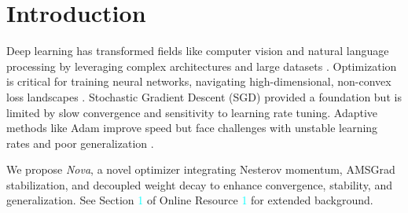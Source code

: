 \documentclass[10pt,twocolumn]{article}
\begin{document}
\begin{abstract}


\noindent\textbf{Keywords:} Deep learning, Optimization, Adaptive Gradient Descent,  AMSGrad, Nesterov Momentum, Weight Decay.
\end{abstract}

%

\section{Introduction}
\label{sec:introduction}

Deep learning has transformed fields like computer vision and natural language processing by leveraging complex architectures and large datasets \cite{He2016, Vaswani2017}. Optimization is critical for training neural networks, navigating high-dimensional, non-convex loss landscapes \cite{Goodfellow2016}. Stochastic Gradient Descent (SGD) \cite{Robbins1951} provided a foundation but is limited by slow convergence and sensitivity to learning rate tuning. Adaptive methods like Adam \cite{Kingma2014} improve speed but face challenges with unstable learning rates and poor generalization \cite{Wilson2017, Loshchilov2017}.

We propose \emph{Nova}, a novel optimizer integrating Nesterov momentum, AMSGrad stabilization, and decoupled weight decay to enhance convergence, stability, and generalization. See Section \textcolor{cyan}{1} of Online Resource \textcolor{cyan}{1}  for extended background.
\end{document}
